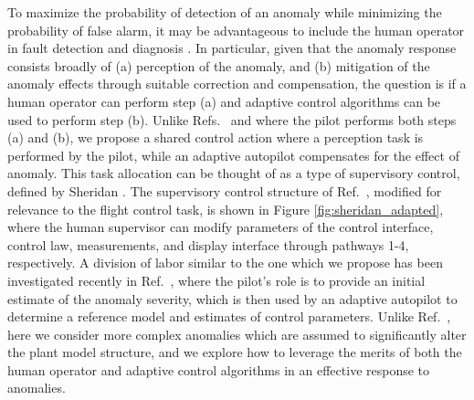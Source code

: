 To maximize the probability of detection of an anomaly while minimizing the probability of false alarm, it may be advantageous to include the human operator in fault detection and diagnosis \cite{sheridan2000human}. In particular, given that the anomaly response consists broadly of (a) perception of the anomaly, and (b) mitigation of the anomaly effects through suitable correction and compensation, the question is if a human operator can perform step (a) and adaptive control algorithms can be used to perform step (b). Unlike Refs.~\cite{hess2015modeling} and \cite{hess2009modeling} where the pilot performs both steps (a) and (b), we propose a shared control action where a perception task is performed by the pilot, while an adaptive autopilot compensates for the effect of anomaly. This task allocation can be thought of as a type of supervisory control, defined by Sheridan \cite{sheridan1976toward, sheridan2011adaptive}. The supervisory control structure of Ref.~\cite{sheridan2011adaptive}, modified for relevance to the flight control task, is shown in Figure \ref{fig:sheridan_adapted}, where the human supervisor can modify parameters of the control interface, control law, measurements, and display interface through pathways 1-4, respectively. A division of labor similar to the one which we propose has been investigated recently in Ref.~\cite{farjadian2017bumpless}, where the pilot's role is to provide an initial estimate of the anomaly severity, which is then used by an adaptive autopilot to determine a reference model and estimates of control parameters. Unlike Ref.~\cite{farjadian2017bumpless}, here we consider more complex anomalies which are assumed to significantly alter the plant model structure, and we explore how to leverage the merits of both the human operator and adaptive control algorithms in an effective response to anomalies.

